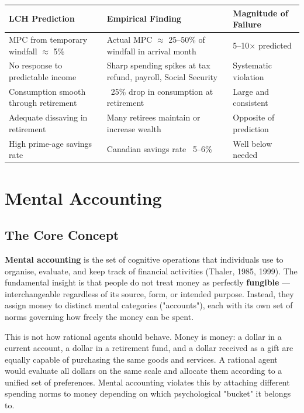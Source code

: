 \documentclass[12pt, letterpaper]{article}
\begin{document}
\begin{table}[H]
\centering
\small
\begin{tabularx}{\linewidth}{lYY}
\toprule
LCH Prediction & Empirical Finding & Magnitude of Failure \\
\midrule
MPC from temporary windfall $\approx$ 5\% & Actual MPC $\approx$ 25--50\% of windfall in arrival month & 5--10$\times$ predicted \\
No response to predictable income & Sharp spending spikes at tax refund, payroll, Social Security & Systematic violation \\
Consumption smooth through retirement & ~25\% drop in consumption at retirement & Large and consistent \\
Adequate dissaving in retirement & Many retirees maintain or increase wealth & Opposite of prediction \\
High prime-age savings rate & Canadian savings rate ~5--6\% & Well below needed \\
\bottomrule
\end{tabularx}
\end{table}


\medskip


\section{Mental Accounting}



\subsection{The Core Concept}


\textbf{Mental accounting} is the set of cognitive operations that individuals use to organise, evaluate, and keep track of financial activities (Thaler, 1985, 1999). The fundamental insight is that people do not treat money as perfectly \textbf{fungible} --- interchangeable regardless of its source, form, or intended purpose. Instead, they assign money to distinct mental categories ("accounts"), each with its own set of norms governing how freely the money can be spent.

This is not how rational agents should behave. Money is money: a dollar in a current account, a dollar in a retirement fund, and a dollar received as a gift are equally capable of purchasing the same goods and services. A rational agent would evaluate all dollars on the same scale and allocate them according to a unified set of preferences. Mental accounting violates this by attaching different spending norms to money depending on which psychological "bucket" it belongs to.
\end{document}
